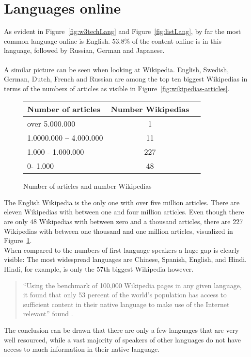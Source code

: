 \section{Languages online}

As evident in Figure~\ref{fig:w3techLang} and Figure~\ref{fig:listLang}, by far the most common language online is English. 53.8\% of the content online is in this language, followed by Russian, German and Japanese. \citep{w3techLang} \\
\\
A similar picture can be seen when looking at Wikipedia. English, Swedish, German, Dutch, French and Russian are among the top ten biggest Wikipedias in terms of the numbers of articles as visible in Figure~\ref{fig:wikipedias-articles}. \\
\begin{figure}[H]
\begin{center}
	\begin{tabular}{| l | c | r |}
		\hline			
		Number of articles & Number Wikipedias \\ \hline
		over 5.000.000 & 1 \\
		1.0000.000 -- 4.000.000 & 11 \\
		1.000 - 1.000.000 & 227 \\
		0- 1.000 & 48 \\
		\hline  
	\end{tabular}
	\end{center}
	\caption{Number of articles and number Wikipedias}
	\label{fig:tableNumWP}
\end{figure}

The English Wikipedia is the only one with over five million articles. There are eleven Wikipedias with between one and four million articles. Even though there are only 48 Wikipedias with between zero and a thousand articles, there are 227 Wikipedias with between one thousand and one million articles, visualized in Figure~\ref{fig:tableNumWP}. \citep{wiki:30} \\

When compared to the numbers of first-language speakers a huge gap is clearly visible: The most widespread languages are Chinese, Spanish, English, and Hindi. Hindi, for example, is only the 57th biggest Wikipedia however.
\begin{quote}
``Using the benchmark of 100,000 Wikipedia pages in any given language, it found that only 53 percent of the world’s population has access to sufficient content in their native language to make use of the Internet relevant'' found \citet{atlanticLang}.
\end{quote} 
The conclusion can be drawn that there are only a few languages that are very well resourced, while a vast majority of speakers of other languages do not have access to much information in their native language. 